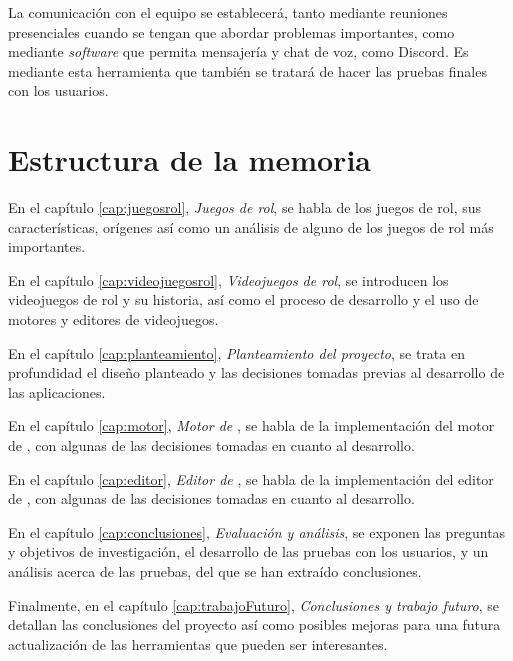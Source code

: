 \medskip

La comunicación con el equipo se establecerá, tanto mediante reuniones presenciales cuando se tengan que abordar problemas importantes, como mediante \textit{software} que permita mensajería y chat de voz, como Discord. Es mediante esta herramienta que también se tratará de hacer las pruebas finales con los usuarios.

\section{Estructura de la memoria} 
En el capítulo \ref{cap:juegosrol}, \textit{Juegos de rol}, se habla de los juegos de rol, sus características, orígenes así como un análisis de alguno de los juegos de rol más importantes.

\medskip

En el capítulo \ref{cap:videojuegosrol}, \textit{Videojuegos de rol}, se introducen los videojuegos de rol y su historia, así como el proceso de desarrollo y el uso de motores y editores de videojuegos.

\medskip

En el capítulo \ref{cap:planteamiento}, \textit{Planteamiento del proyecto}, se trata en profundidad el diseño planteado y las decisiones tomadas previas al desarrollo de las aplicaciones.

\medskip

En el capítulo \ref{cap:motor}, \textit{Motor de \baker}, se habla de la implementación del motor de \baker, con algunas de las decisiones tomadas en cuanto al desarrollo.

\medskip

En el capítulo \ref{cap:editor}, \textit{Editor de \baker}, se habla de la implementación del editor de \baker, con algunas de las decisiones tomadas en cuanto al desarrollo.

\medskip

En el capítulo \ref{cap:conclusiones}, \textit{Evaluación y análisis}, se exponen las preguntas y objetivos de investigación, el desarrollo de las pruebas con los usuarios, y un análisis acerca de las pruebas, del que se han extraído conclusiones.

\medskip

Finalmente, en el capítulo \ref{cap:trabajoFuturo}, \textit{Conclusiones y trabajo futuro}, se detallan las conclusiones del proyecto así como posibles mejoras para una futura actualización de las herramientas que pueden ser interesantes.